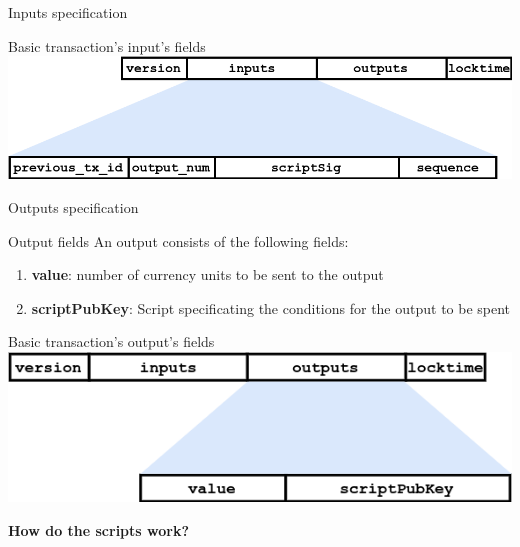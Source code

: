 \documentclass{beamer}
\begin{document}
\begin{frame}{Inputs specification}
 \begin{exampleblock}{Basic transaction's input's fields}
  \includegraphics[width=\textwidth, height=0.8\textheight, keepaspectratio]{img/tx_input.png}
 \end{exampleblock}
\end{frame}
\begin{frame}{Outputs specification}
 \begin{block}{Output fields}
  An output consists of the following fields:
  \pause
  \begin{enumerate}[<+->]
   \item \textbf{value}: number of currency units to be sent to the output
   \item \textbf{scriptPubKey}: Script specificating the conditions for the output to be spent
  \end{enumerate}
 \end{block}
 \pause
 \begin{exampleblock}{Basic transaction's output's fields}
  \includegraphics[width=\textwidth, height=0.8\textheight, keepaspectratio]{img/tx_output.png}
 \end{exampleblock}
\end{frame}
\begin{frame}
 \begin{center}
  \textbf{How do the scripts work?}
 \end{center}
\end{frame}
\end{document}

